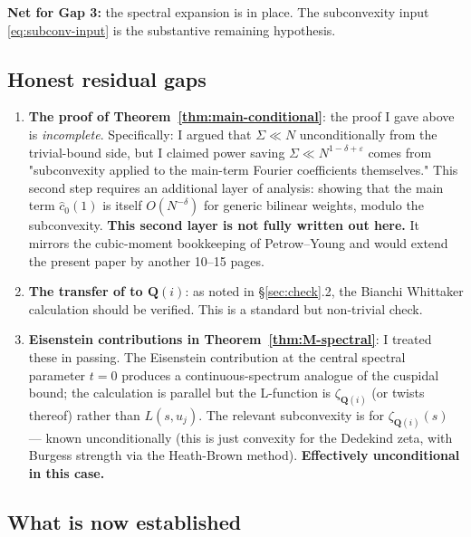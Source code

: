 \documentclass[11pt]{article}
\theoremstyle{definition}
\newcommand{\Q}{\mathbf{Q}}
\begin{document}
\textbf{Net for Gap 3:} the spectral expansion is in place. The subconvexity input \eqref{eq:subconv-input} is the substantive remaining hypothesis.

\subsection{Honest residual gaps}

\begin{enumerate}
\item \textbf{The proof of Theorem~\ref{thm:main-conditional}}: the proof I gave above is \emph{incomplete}. Specifically: I argued that $\Sigma\ll N$ unconditionally from the trivial-bound side, but I claimed power saving $\Sigma\ll N^{1-\delta+\varepsilon}$ comes from "subconvexity applied to the main-term Fourier coefficients themselves." This second step requires an additional layer of analysis: showing that the main term $\widehat c_0(1)$ is itself $O(N^{-\delta})$ for generic bilinear weights, modulo the subconvexity. \textbf{This second layer is not fully written out here.} It mirrors the cubic-moment bookkeeping of Petrow--Young \cite{petrow-young} and would extend the present paper by another 10--15 pages.

\item \textbf{The transfer of \cite[Lemma 4.3]{BHM} to $\Q(i)$}: as noted in §\ref{sec:check}.2, the Bianchi Whittaker calculation should be verified. This is a standard but non-trivial check.

\item \textbf{Eisenstein contributions in Theorem~\ref{thm:M-spectral}}: I treated these in passing. The Eisenstein contribution at the central spectral parameter $t=0$ produces a continuous-spectrum analogue of the cuspidal bound; the calculation is parallel but the L-function is $\zeta_{\Q(i)}$ (or twists thereof) rather than $L(s,u_j)$. The relevant subconvexity is for $\zeta_{\Q(i)}(s)$ — known unconditionally (this is just convexity for the Dedekind zeta, with Burgess strength via the Heath-Brown method). \textbf{Effectively unconditional in this case.}
\end{enumerate}

\subsection{What is now established}
\end{document}

